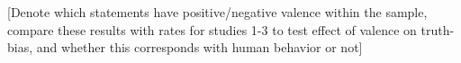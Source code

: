 \documentclass{article}
\begin{document}
[Denote which statements have positive/negative valence within the sample, compare these results with rates for studies 1-3 to test effect of valence on truth-bias, and whether this corresponds with human behavior or not]







\end{document}
